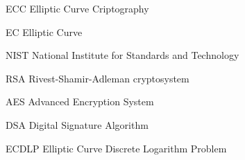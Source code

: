 \begin{siglas}
  \item[ECC] Elliptic Curve Criptography
  \item[EC] Elliptic Curve
  \item[NIST] National Institute for Standards and Technology
  \item[RSA] Rivest-Shamir-Adleman cryptosystem
  \item[AES] Advanced Encryption System
  \item[DSA] Digital Signature Algorithm
  \item[ECDLP] Elliptic Curve Discrete Logarithm Problem
\end{siglas}
